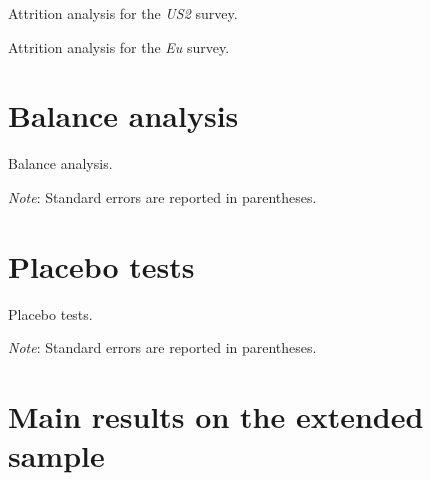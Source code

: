 \begin{table}[h]\label{tab:attrition_US2}
    \caption[Attrition analysis: \textit{US2}]{Attrition analysis for the \textit{US2} survey.} 
    \makebox[\textwidth][c]{
\resizebox*{!}{.73\textheight}{ %
        
        }
    }
    {\footnotesize %
    }
\end{table}

\begin{table}[h]\label{tab:attrition_EU}
    \caption[Attrition analysis: \textit{Eu}]{Attrition analysis for the \textit{Eu} survey.} 
    \makebox[\textwidth][c]{
\resizebox*{!}{.73\textheight}{ %
        
        }
    }
    {\footnotesize %
    }
\end{table}

\clearpage
\section{Balance analysis}\label{app:balance}

\begin{table}[h]\label{tab:balance}
    \caption[Balance analysis]{Balance analysis.} 
    \makebox[\textwidth][c]{
\resizebox*{!}{.72\textheight}{ %
        
        }
    }
    {\footnotesize \textit{Note}: Standard errors are reported in parentheses.
    }
\end{table}
\clearpage

\section{Placebo tests}\label{app:placebo}

\begin{table}[h]\label{tab:placebo}
    \caption[Placebo tests]{Placebo tests.} 
    \makebox[\textwidth][c]{
        
        }
    {\footnotesize \textit{Note}: Standard errors are reported in parentheses.
    }
\end{table}

\section{Main results on the extended sample}\label{app:extended}

